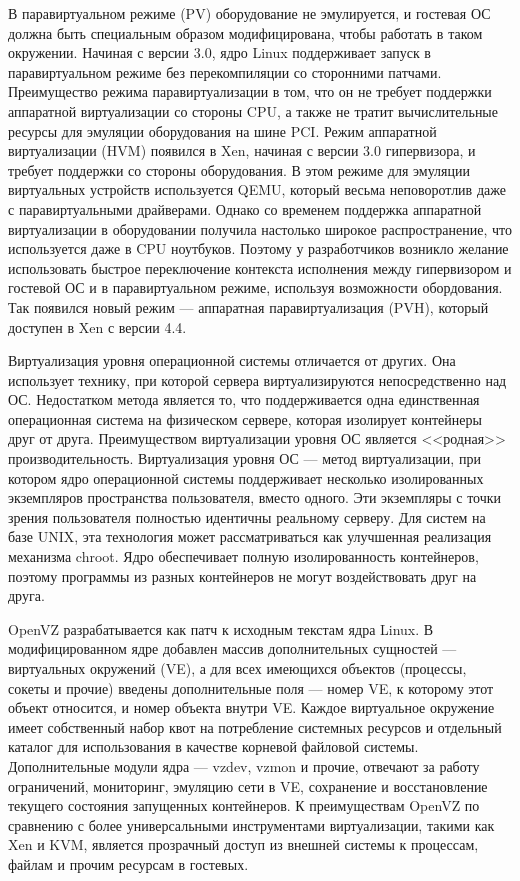 В паравиртуальном режиме (PV) оборудование не эмулируется, и гостевая ОС должна быть специальным образом модифицирована, чтобы работать в таком окружении.
Начиная с версии 3.0, ядро Linux поддерживает запуск в паравиртуальном режиме без перекомпиляции со сторонними патчами.
Преимущество режима паравиртуализации в том, что он не требует поддержки аппаратной виртуализации со стороны CPU, а также не тратит вычислительные ресурсы для эмуляции оборудования на шине PCI.
Режим аппаратной виртуализации (HVM) появился в Xen, начиная с версии 3.0 гипервизора, и требует поддержки со стороны оборудования.
В этом режиме для эмуляции виртуальных устройств используется QEMU, который весьма неповоротлив даже с паравиртуальными драйверами.
Однако со временем поддержка аппаратной виртуализации в оборудовании получила настолько широкое распространение, что используется даже в CPU ноутбуков.
Поэтому у разработчиков возникло желание использовать быстрое переключение контекста исполнения между гипервизором и гостевой ОС и в паравиртуальном режиме, используя возможности обордования.
Так появился новый режим --- аппаратная паравиртуализация (PVH), который доступен в Xen с версии 4.4.

Виртуализация уровня операционной системы отличается от других.
Она использует технику, при которой сервера виртуализируются непосредственно над ОС.
Недостатком метода является то, что поддерживается одна единственная операционная система на физическом сервере, которая изолирует контейнеры друг от друга.
Преимуществом виртуализации уровня ОС является <<родная>> производительность.
Виртуализация уровня ОС --- метод виртуализации, при котором ядро операционной системы поддерживает несколько изолированных экземпляров пространства пользователя, вместо одного.
Эти экземпляры с точки зрения пользователя полностью идентичны реальному серверу.
Для систем на базе UNIX, эта технология может рассматриваться как улучшенная реализация механизма chroot.
Ядро обеспечивает полную изолированность контейнеров, поэтому программы из разных контейнеров не могут воздействовать друг на друга.

OpenVZ разрабатывается как патч к исходным текстам ядра Linux.
В модифицированном ядре добавлен массив дополнительных сущностей --- виртуальных окружений (VE), а для всех имеющихся объектов (процессы, сокеты и прочие) введены дополнительные поля --- номер VE, к которому этот объект относится, и номер объекта внутри VE.
Каждое виртуальное окружение имеет собственный набор квот на потребление системных ресурсов и отдельный каталог для использования в качестве корневой файловой системы.
Дополнительные модули ядра --- vzdev, vzmon и прочие, отвечают за работу ограничений, мониторинг, эмуляцию сети в VE, сохранение и восстановление текущего состояния запущенных контейнеров.
К преимуществам OpenVZ по сравнению с более универсальными инструментами виртуализации, такими как Xen и KVM, является прозрачный доступ из внешней системы к процессам, файлам и прочим ресурсам в гостевых.


